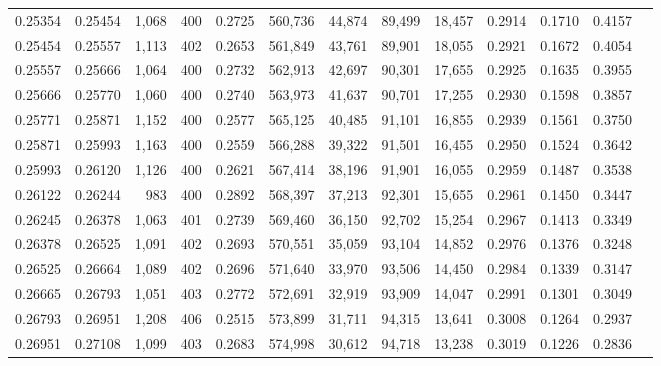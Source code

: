 \begin{tabular}{rrrrrrrrrrrrr}
0.25354 & 0.25454 & 1,068 & 400 &                                     0.2725 & 560,736 &  44,874 &  89,499 &  18,457 & 0.2914 & 0.1710 & 0.4157 \\
0.25454 & 0.25557 & 1,113 & 402 &                                     0.2653 & 561,849 &  43,761 &  89,901 &  18,055 & 0.2921 & 0.1672 & 0.4054 \\
0.25557 & 0.25666 & 1,064 & 400 &                                     0.2732 & 562,913 &  42,697 &  90,301 &  17,655 & 0.2925 & 0.1635 & 0.3955 \\
0.25666 & 0.25770 & 1,060 & 400 &                                     0.2740 & 563,973 &  41,637 &  90,701 &  17,255 & 0.2930 & 0.1598 & 0.3857 \\
0.25771 & 0.25871 & 1,152 & 400 &                                     0.2577 & 565,125 &  40,485 &  91,101 &  16,855 & 0.2939 & 0.1561 & 0.3750 \\
0.25871 & 0.25993 & 1,163 & 400 &                                     0.2559 & 566,288 &  39,322 &  91,501 &  16,455 & 0.2950 & 0.1524 & 0.3642 \\
0.25993 & 0.26120 & 1,126 & 400 &                                     0.2621 & 567,414 &  38,196 &  91,901 &  16,055 & 0.2959 & 0.1487 & 0.3538 \\
0.26122 & 0.26244 &   983 & 400 &                                     0.2892 & 568,397 &  37,213 &  92,301 &  15,655 & 0.2961 & 0.1450 & 0.3447 \\
0.26245 & 0.26378 & 1,063 & 401 &                                     0.2739 & 569,460 &  36,150 &  92,702 &  15,254 & 0.2967 & 0.1413 & 0.3349 \\
0.26378 & 0.26525 & 1,091 & 402 &                                     0.2693 & 570,551 &  35,059 &  93,104 &  14,852 & 0.2976 & 0.1376 & 0.3248 \\
0.26525 & 0.26664 & 1,089 & 402 &                                     0.2696 & 571,640 &  33,970 &  93,506 &  14,450 & 0.2984 & 0.1339 & 0.3147 \\
0.26665 & 0.26793 & 1,051 & 403 &                                     0.2772 & 572,691 &  32,919 &  93,909 &  14,047 & 0.2991 & 0.1301 & 0.3049 \\
0.26793 & 0.26951 & 1,208 & 406 &                                     0.2515 & 573,899 &  31,711 &  94,315 &  13,641 & 0.3008 & 0.1264 & 0.2937 \\
0.26951 & 0.27108 & 1,099 & 403 &                                     0.2683 & 574,998 &  30,612 &  94,718 &  13,238 & 0.3019 & 0.1226 & 0.2836 \\

\end{tabular}
